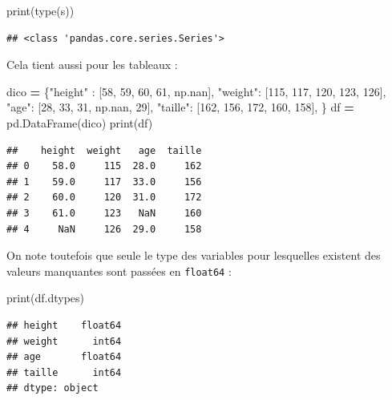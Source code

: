 \documentclass[12pt,]{book}
\newenvironment{Shaded}{\begin{snugshade}}{\end{snugshade}}
\newcommand{\DecValTok}[1]{\textcolor[rgb]{0.00,0.00,0.81}{#1}}
\newcommand{\StringTok}[1]{\textcolor[rgb]{0.31,0.60,0.02}{#1}}
\newcommand{\OperatorTok}[1]{\textcolor[rgb]{0.81,0.36,0.00}{\textbf{#1}}}
\newcommand{\BuiltInTok}[1]{#1}
\newcommand{\NormalTok}[1]{#1}
\numberwithin{equation}{section}
\numberwithin{countremarque}{section}
\begin{document}
\begin{Shaded}
\begin{Highlighting}[]
\BuiltInTok{print}\NormalTok{(}\BuiltInTok{type}\NormalTok{(s))}
\end{Highlighting}
\end{Shaded}

\begin{lstlisting}
## <class 'pandas.core.series.Series'>
\end{lstlisting}

Cela tient aussi pour les tableaux :

\begin{Shaded}
\begin{Highlighting}[]
\NormalTok{dico }\OperatorTok{=}\NormalTok{ \{}\StringTok{"height"}\NormalTok{ : [}\DecValTok{58}\NormalTok{, }\DecValTok{59}\NormalTok{, }\DecValTok{60}\NormalTok{, }\DecValTok{61}\NormalTok{, np.nan],}
        \StringTok{"weight"}\NormalTok{: [}\DecValTok{115}\NormalTok{, }\DecValTok{117}\NormalTok{, }\DecValTok{120}\NormalTok{, }\DecValTok{123}\NormalTok{, }\DecValTok{126}\NormalTok{],}
        \StringTok{"age"}\NormalTok{: [}\DecValTok{28}\NormalTok{, }\DecValTok{33}\NormalTok{, }\DecValTok{31}\NormalTok{, np.nan, }\DecValTok{29}\NormalTok{],}
        \StringTok{"taille"}\NormalTok{: [}\DecValTok{162}\NormalTok{, }\DecValTok{156}\NormalTok{, }\DecValTok{172}\NormalTok{, }\DecValTok{160}\NormalTok{, }\DecValTok{158}\NormalTok{],}
\NormalTok{       \} }
\NormalTok{df }\OperatorTok{=}\NormalTok{ pd.DataFrame(dico)}
\BuiltInTok{print}\NormalTok{(df)}
\end{Highlighting}
\end{Shaded}

\begin{lstlisting}
##    height  weight   age  taille
## 0    58.0     115  28.0     162
## 1    59.0     117  33.0     156
## 2    60.0     120  31.0     172
## 3    61.0     123   NaN     160
## 4     NaN     126  29.0     158
\end{lstlisting}

On note toutefois que seule le type des variables pour lesquelles
existent des valeurs manquantes sont passées en \texttt{float64} :

\begin{Shaded}
\begin{Highlighting}[]
\BuiltInTok{print}\NormalTok{(df.dtypes)}
\end{Highlighting}
\end{Shaded}

\begin{lstlisting}
## height    float64
## weight      int64
## age       float64
## taille      int64
## dtype: object
\end{lstlisting}
\end{document}
